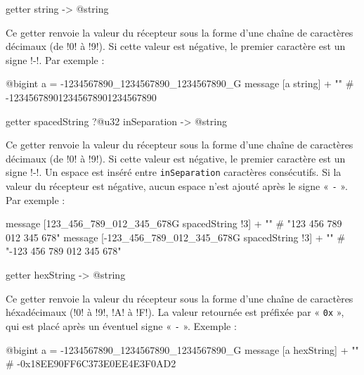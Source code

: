 
\begin{galgas4box}
getter string -> @string
\end{galgas4box}

Ce getter renvoie la valeur du récepteur sous la forme d'une chaîne de caractères décimaux (de \ggsq!0! à \ggsq!9!). Si cette valeur est négative, le premier caractère est un signe \ggsq!-!. Par exemple :

\begin{galgas4}
@bigint a = -1234567890_1234567890_1234567890_G
message [a string] + "\n" # -123456789012345678901234567890
\end{galgas4}




\begin{galgas4box}
getter spacedString ?@u32 inSeparation -> @string
\end{galgas4box}

Ce getter renvoie la valeur du récepteur sous la forme d'une chaîne de caractères décimaux (de \ggsq!0! à \ggsq!9!). Si cette valeur est négative, le premier caractère est un signe \ggsq!-!. Un espace est inséré entre \texttt{inSeparation} caractères consécutifs. Si la valeur du récepteur est négative, aucun espace n'est ajouté après le signe « \texttt{-} ». Par exemple :

\begin{galgas4}
message [123_456_789_012_345_678G spacedString !3] + "\n"
# "123 456 789 012 345 678"
message [-123_456_789_012_345_678G spacedString !3] + "\n"
# "-123 456 789 012 345 678"
\end{galgas4}






\begin{galgas4box}
getter hexString -> @string
\end{galgas4box}

Ce getter renvoie la valeur du récepteur sous la forme d'une chaîne de caractères héxadécimaux (\ggsq!0! à \ggsq!9!, \ggsq!A! à \ggsq!F!). La valeur retournée est préfixée par « \texttt{0x} », qui est placé après un éventuel signe « \texttt{-} ». Exemple :

\begin{galgas4}
@bigint a = -1234567890_1234567890_1234567890_G
message [a hexString] + "\n" # -0x18EE90FF6C373E0EE4E3F0AD2
\end{galgas4}








